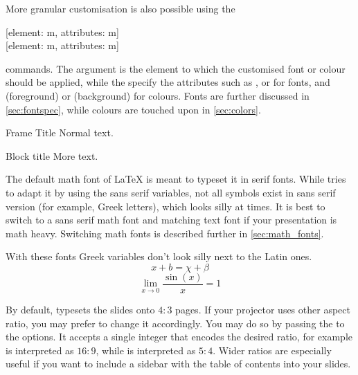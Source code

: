 More granular customisation is also possible using the
\begin{lscommand}
  [element: m, attributes: m] \\
  [element: m, attributes: m]
\end{lscommand}
commands. The  argument is the element to which the customised
font or colour should be applied, while the  specify the attributes
such as ,  or  for fonts, and
 (foreground) or  (background) for colours. Fonts are
further discussed in \autoref{sec:fontspec}, while colours are touched upon in
\autoref{sec:colors}.
\begin{example}

\begin{frame}{Frame Title}
  Normal text.
  \begin{block}{Block title}
    More text.
  \end{block}
\end{frame}
\end{example}

The default math font of \LaTeX{} is meant to typeset it in serif fonts. While
 tries to adapt it by using the sans serif variables, not all
symbols exist in sans serif version (for example, Greek letters), which looks
silly at times. It is best to switch to a sans serif math font and matching
text font if your presentation is math heavy. Switching math fonts is described
further in \autoref{sec:math_fonts}.
\begin{example}
\usepackage{unicode-math}
\setsansfont{Fira Sans}
\setoperatorfont{\mathsf}

\begin{frame} %
With these fonts Greek
variables don't look silly
next to the Latin ones.
\[ x + b = \chi + \beta \]
\[ \lim_{x \to 0}
   \frac{\sin(x)}{x} = 1 \]
\end{frame} %
\end{example}

By default,  typesets the slides onto \(4 : 3\) pages. If your
projector uses other aspect ratio, you may prefer to change it accordingly. You
may do so by passing the  to the  options.
It accepts a single integer that encodes the desired ratio, for example
 is interpreted as \(16:9\), while  is interpreted as
\(5:4\). Wider ratios are especially useful if you want to include a sidebar
with the table of contents into your slides.

